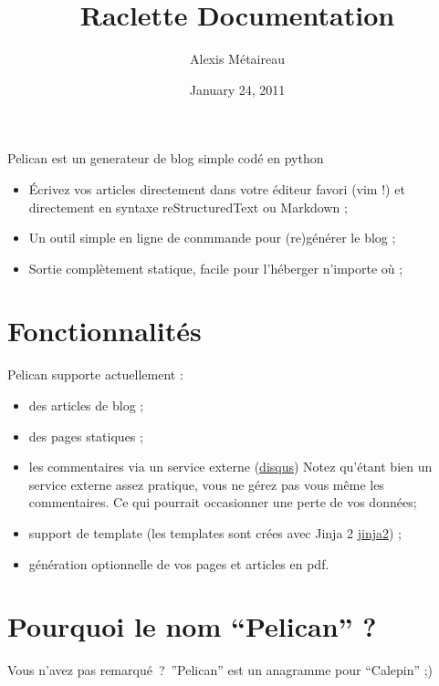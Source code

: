 \documentclass[letterpaper,10pt,english]{manual}
\title{Raclette Documentation}
\date{January 24, 2011}
\author{Alexis Métaireau}
\begin{document}
\maketitle
\tableofcontents
\hypertarget{--doc-index}{}


Pelican est un generateur de blog simple codé en python
\begin{itemize}
\item {} 
Écrivez vos articles directement dans votre éditeur favori (vim !) et
directement en syntaxe reStructuredText ou Markdown ;

\item {} 
Un outil simple en ligne de conmmande pour (re)générer le blog ;

\item {} 
Sortie complètement statique, facile pour l'héberger n'importe où ;

\end{itemize}


\chapter{Fonctionnalités}

Pelican supporte actuellement :
\begin{itemize}
\item {} 
des articles de blog ;

\item {} 
des pages statiques ;

\item {} 
les commentaires via un service externe (\href{http://disqus.com}{disqus})
Notez qu'étant bien un service externe assez pratique, vous ne gérez pas
vous même les commentaires. Ce qui pourrait occasionner une perte de vos données;

\item {} 
support de template (les templates sont crées avec Jinja 2 \href{http://jinjna.pocoo.org}{jinja2}) ;

\item {} 
génération optionnelle de vos pages et articles en pdf.

\end{itemize}


\chapter{Pourquoi le nom ``Pelican'' ?}

Vous n'avez pas remarqué ? ''Pelican'' est un anagramme pour ``Calepin'' ;)
\end{document}
